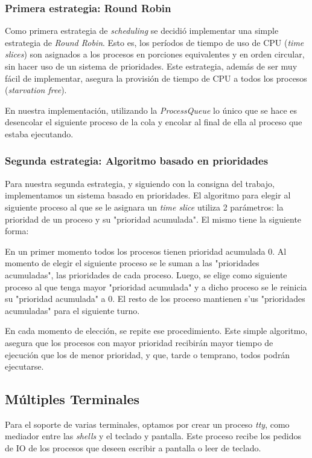 \documentclass[a4paper,10pt]{article}
\begin{document}
        \subsubsection{Primera estrategia: Round Robin}
        Como primera estrategia de \textit{scheduling} se decidió implementar una simple estrategia de \textit{Round Robin}.
        Esto es, los períodos de tiempo de uso de CPU (\textit{time slices}) son asignados a los procesos en porciones 
        equivalentes y en orden circular, sin hacer uso de un sistema de prioridades. Este estrategia, además de ser muy 
        fácil de implementar, asegura la provisión de tiempo de CPU a todos los procesos (\textit{starvation free}).

	En nuestra implementación, utilizando la \textit{ProcessQueue} lo único que se hace es desencolar el siguiente proceso 
	de la cola y encolar al final de ella al proceso que estaba ejecutando.

        \subsubsection{Segunda estrategia: Algoritmo basado en prioridades}
        Para nuestra segunda estrategia, y siguiendo con la consigna del trabajo, implementamos un sistema basado en 
        prioridades. El algoritmo para elegir al siguiente proceso al que se le asignara un \textit{time slice} utiliza
        2 parámetros: la prioridad de un proceso y su "prioridad acumulada". El mismo tiene la siguiente forma:

        En un primer momento todos los procesos tienen prioridad acumulada 0. Al momento de elegir el siguiente proceso
        se le suman a las "prioridades acumuladas", las prioridades de cada proceso. Luego, se elige como siguiente 
        proceso al que tenga mayor "prioridad acumulada" y a dicho proceso se le reinicia su "prioridad acumulada" a 0.
        El resto de los proceso mantienen s'us "prioridades acumuladas" para el siguiente turno. 

        En cada momento de elección, se repite ese procedimiento. Este simple algoritmo, asegura que los procesos con 
        mayor prioridad recibirán mayor tiempo de ejecución que los de menor prioridad, y que, tarde o temprano, todos
        podrán ejecutarse.

\subsection{Múltiples Terminales}
Para el soporte de varias terminales, optamos por crear un proceso \textit{tty}, como mediador entre las \textit{shells} y el teclado y pantalla.
Este proceso recibe los pedidos de IO de los procesos que deseen escribir a pantalla o leer de teclado.
\end{document}
